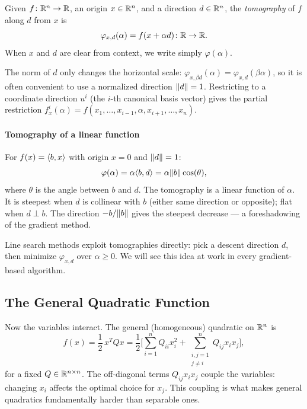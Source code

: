 \begin{defn}[Tomography]\label{def:tomography}
	Given $f \colon \mathbb{R}^n \to \mathbb{R}$, an origin $x \in \mathbb{R}^n$, and a direction $d \in \mathbb{R}^n$, the \textit{tomography} of $f$ along $d$ from $x$ is
	\begin{equation}\label{eq:tomography}
		\varphi_{x,d}(\alpha) = f(x + \alpha d) \colon \mathbb{R} \to \mathbb{R}.
	\end{equation}
	When $x$ and $d$ are clear from context, we write simply $\varphi(\alpha)$.
\end{defn}

The norm of $d$ only changes the horizontal scale: $\varphi_{x, \beta d}(\alpha) = \varphi_{x, d}(\beta \alpha)$, so it is often convenient to use a normalized direction $\lVert d\rVert = 1$.
Restricting to a coordinate direction $u^i$ (the $i$-th canonical basis vector) gives the partial restriction $f_x^i(\alpha) = f(x_1, \dots, x_{i-1}, \alpha, x_{i+1}, \dots, x_n)$.

\paragraph{Tomography of a linear function}

For $f(x) = \langle b, x\rangle$ with origin $x = 0$ and $\lVert d\rVert = 1$:
\begin{equation}\label{eq:tomography-linear}
	\varphi(\alpha) = \alpha \langle b, d\rangle = \alpha \lVert b\rVert \cos(\theta),
\end{equation}
where $\theta$ is the angle between $b$ and $d$.
The tomography is a linear function of $\alpha$.
It is steepest when $d$ is collinear with $b$ (either same direction or opposite); flat when $d \perp b$.
The direction $-b / \lVert b\rVert$ gives the steepest decrease --- a foreshadowing of the gradient method.

Line search methods exploit tomographies directly: pick a descent direction $d$, then minimize $\varphi_{x,d}$ over $\alpha \geq 0$.
We will see this idea at work in every gradient-based algorithm.


\subsection{The General Quadratic Function}\label{ssec:general-quad}

Now the variables interact.
The general (homogeneous) quadratic on $\mathbb{R}^n$ is
\begin{equation}\label{eq:homogeneous-quad}
	f(x) = \frac{1}{2}\, x^T Q x
	= \frac{1}{2} \biggl[\sum_{i=1}^{n} Q_{ii} x_i^2
		+ \sum_{\substack{i,j=1 \\ j \neq i}}^{n} Q_{ij} x_i x_j\biggr],
\end{equation}
for a fixed $Q \in \mathbb{R}^{n \times n}$.
The off-diagonal terms $Q_{ij} x_i x_j$ couple the variables: changing $x_i$ affects the optimal choice for $x_j$.
This coupling is what makes general quadratics fundamentally harder than separable ones.

